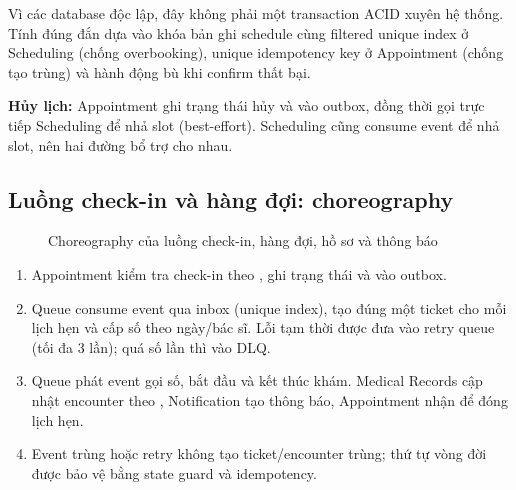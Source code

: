 Vì các database độc lập, đây không phải một transaction ACID xuyên hệ thống. Tính đúng đắn dựa vào khóa bản ghi schedule cùng filtered unique index ở Scheduling (chống overbooking), unique idempotency key ở Appointment (chống tạo trùng) và hành động bù khi confirm thất bại.

\textbf{Hủy lịch:} Appointment ghi trạng thái hủy và  vào outbox, đồng thời gọi trực tiếp Scheduling để nhả slot (best-effort). Scheduling cũng consume event để nhả slot, nên hai đường bổ trợ cho nhau.

\subsection{Luồng check-in và hàng đợi: choreography}

\begin{figure}[!t]
\centering
{}
\caption{Choreography của luồng check-in, hàng đợi, hồ sơ và thông báo}
\label{fig:checkin}
\end{figure}

\begin{enumerate}
  \item Appointment kiểm tra check-in theo , ghi trạng thái và  vào outbox.
  \item Queue consume event qua inbox (unique index), tạo đúng một ticket cho mỗi lịch hẹn và cấp số theo ngày/bác sĩ. Lỗi tạm thời được đưa vào retry queue (tối đa 3 lần); quá số lần thì vào DLQ.
  \item Queue phát event gọi số, bắt đầu và kết thúc khám. Medical Records cập nhật encounter theo , Notification tạo thông báo, Appointment nhận  để đóng lịch hẹn.
  \item Event trùng hoặc retry không tạo ticket/encounter trùng; thứ tự vòng đời được bảo vệ bằng state guard và idempotency.
\end{enumerate}

